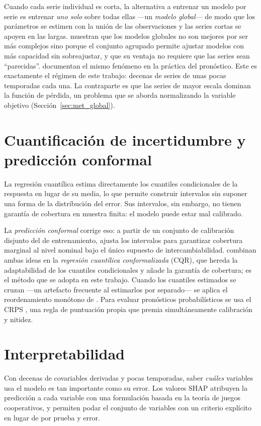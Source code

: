 Cuando cada serie individual es corta, la alternativa a entrenar un modelo por serie es
entrenar \emph{uno solo} sobre todas ellas ---un \emph{modelo global}--- de modo que los
parámetros se estimen con la unión de las observaciones y las series cortas se apoyen en las
largas. \citet{montero2021} muestran que los modelos globales no son mejores por ser más
complejos sino porque el conjunto agrupado permite ajustar modelos con más capacidad sin
sobreajustar, y que su ventaja no requiere que las series sean ``parecidas''.
\citet{petropoulos2022} documentan el mismo fenómeno en la práctica del pronóstico. Este es
exactamente el régimen de este trabajo: decenas de series de unas pocas temporadas cada una.
La contraparte es que las series de mayor escala dominan la función de pérdida, un problema
que se aborda normalizando la variable objetivo (Sección~\ref{sec:met_global}).

\section{Cuantificación de incertidumbre y predicción conformal}
\label{sec:revision_conformal}

La regresión cuantílica \citep{koenker1978} estima directamente los cuantiles condicionales de
la respuesta en lugar de su media, lo que permite construir intervalos sin suponer una forma
de la distribución del error. Sus intervalos, sin embargo, no tienen garantía de cobertura en
muestra finita: el modelo puede estar mal calibrado.

La \emph{predicción conformal} \citep{vovk2005,angelopoulos2023} corrige eso: a partir de un
conjunto de calibración disjunto del de entrenamiento, ajusta los intervalos para garantizar
cobertura marginal al nivel nominal bajo el único supuesto de intercambiabilidad.
\citet{romano2019} combinan ambas ideas en la \emph{regresión cuantílica conformalizada} (CQR),
que hereda la adaptabilidad de los cuantiles condicionales y añade la garantía de cobertura;
es el método que se adopta en este trabajo. Cuando los cuantiles estimados se cruzan ---un
artefacto frecuente al estimarlos por separado--- se aplica el reordenamiento monótono de
\citet{chernozhukov2010}. Para evaluar pronósticos probabilísticos se usa el CRPS
\citep{gneiting2007}, una regla de puntuación propia que premia simultáneamente calibración y
nitidez.

\section{Interpretabilidad}
\label{sec:revision_shap}

Con decenas de covariables derivadas y pocas temporadas, saber \emph{cuáles} variables usa el
modelo es tan importante como su error. Los valores SHAP \citep{lundberg2017} atribuyen la
predicción a cada variable con una formulación basada en la teoría de juegos cooperativos, y
permiten podar el conjunto de variables con un criterio explícito en lugar de por prueba y
error.
